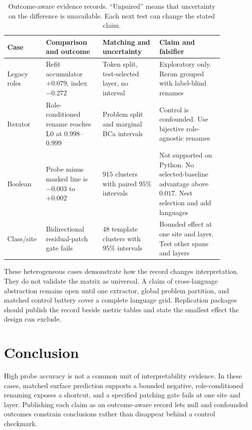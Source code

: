 \documentclass{article}
\begin{document}
\begin{table}[t]
\centering
\small
\setlength{\tabcolsep}{3pt}
\caption{Outcome-aware evidence records. ``Unpaired'' means that uncertainty on
the difference is unavailable. Each next test can change the stated claim.}
\label{tab:controls}
\begin{tabular}{L{0.13\linewidth}L{0.24\linewidth}L{0.24\linewidth}L{0.27\linewidth}}
\toprule
Case & Comparison and outcome & Matching and uncertainty & Claim and falsifier \\
\midrule
Legacy roles &
Refit accumulator $+0.079$, index $-0.272$ &
Token split, test-selected layer, no interval &
Exploratory only. Rerun grouped with label-blind renames \\
Iterator &
Role-conditioned rename reaches L0 at $0.998$--$0.999$ &
Problem split and marginal BCa intervals &
Control is confounded. Use bijective role-agnostic renames \\
Boolean &
Probe minus masked line is $-0.003$ to $+0.002$ &
$915$ clusters with paired $95\%$ intervals &
Not supported on Python. No selected-baseline advantage above $0.017$. Nest selection and add languages \\
Class/site &
Bidirectional residual-patch gate fails &
$48$ template clusters with $95\%$ intervals &
Bounded effect at one site and layer. Test other spans and layers \\
\bottomrule
\end{tabular}
\end{table}

These heterogeneous cases demonstrate how the record changes interpretation.
They do not validate the matrix as universal. A claim of cross-language
abstraction remains open until one extractor, global problem partition, and
matched control battery cover a complete language grid. Replication packages
should publish the record beside metric tables and state the smallest effect
the design can exclude.

\section{Conclusion}

High probe accuracy is not a common unit of interpretability evidence. In
these cases, matched surface prediction supports a bounded negative,
role-conditioned renaming exposes a shortcut, and a specified patching gate
fails at one site and layer. Publishing each claim as an outcome-aware
record lets null and confounded outcomes constrain conclusions rather than
disappear behind a control checkmark.
\end{document}
